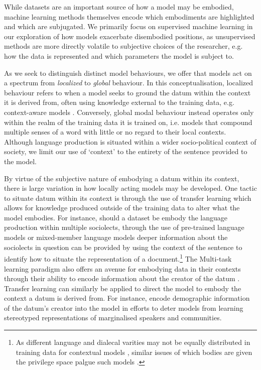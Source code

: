 While datasets are an important source of how a model may be embodied, machine learning methods themselves encode which embodiments are highlighted and which are subjugated. We primarily focus on supervised machine learning in our exploration of how models exacerbate disembodied positions, as unsupervised methods are more directly volatile to subjective choices of the researcher, e.g. how the data is represented and which parameters the model is subject to.

As we seek to distinguish distinct model behaviours, we offer that models act on a spectrum from \textit{localized} to \textit{global} behaviour. In this conceptualisation, localized behaviour refers to when a model seeks to ground the datum within the context it is derived from, often using knowledge external to the training data, e.g. context-aware models \cite{Garcia:2019,Devlin:2019}. Conversely, global modal behaviour instead operates only within the realm of the training data it is trained on, i.e. models that compound multiple senses of a word with little or no regard to their local contexts. Although language production is situated within a wider socio-political context of society, we limit our use of `context' to the entirety of the sentence provided to the model.

By virtue of the subjective nature of embodying a datum within its context, there is large variation in how locally acting models may be developed. One tactic to situate datum within its context is through the use of transfer learning which allows for knowledge produced outside of the training data to alter what the model embodies. For instance, should a dataset be embody the language production within multiple sociolects, through the use of pre-trained language models \cite{Devlin:2019} or mixed-member language models \cite{Blodgett:2016} deeper information about the sociolects in question can be provided by using the context of the sentence to identify how to situate the representation of a document.\footnote{As different language and dialecal varities may not be equally distributed in training data for contextual models \cite{Dunn:2020}, similar issues of which bodies are given the privilege space palgue such models \cite{Tan-Celis:2019}.} The Multi-task learning paradigm also offers an avenue for embodying data in their contexts through their ability to encode information about the creator of the datum \cite{Benton:2017,Garcia:2019}. Transfer learning can similarly be applied to direct the model to embody the context a datum is derived from. For instance, \citet{Romanov:2019} encode demographic information of the datum's creator into the model in efforts to deter models from learning stereotyped representations of marginalised speakers and communities.

